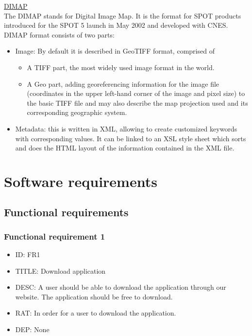 \documentclass[11pt]{article}
\begin{document}
\noindent \underline{DIMAP}\\
The DIMAP stands for Digital Image Map. It is the format for SPOT products introduced for the SPOT 5 launch in May 2002 and developed with CNES.\footnotemark \\
DIMAP format consists of two parts:\footnotemark[\value{footnote}]
\begin{itemize}
\item Image: By default it is described in GeoTIFF format, comprised of
\begin{itemize}
\item A TIFF part, the most widely used image format in the world.
\item A Geo part, adding georeferencing information for the image file (coordinates in the upper left-hand corner of the image and pixel size) to the basic TIFF file and may also describe the map projection used and its corresponding geographic system.
\end{itemize}
\item Metadata: this is written in XML, allowing to create customized keywords with corresponding values. It can be linked to an XSL style sheet which sorts and does the HTML layout of the information contained in the XML file.
\end{itemize}

\section{Software requirements}
\subsection{Functional requirements}
\subsubsection{Functional requirement 1}
\begin{itemize}
\item ID: FR1
\item TITLE: Download application
\item DESC: A user should be able to download the application through our website. The application should be free to download.
\item RAT: In order for a user to download the application.
\item DEP: None
\end{itemize}
\end{document}
